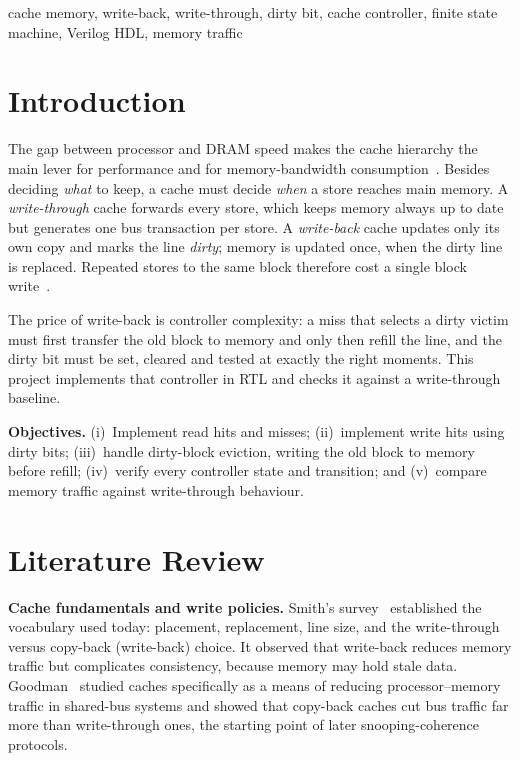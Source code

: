 \documentclass[conference]{IEEEtran}
\begin{document}
\begin{IEEEkeywords}
cache memory, write-back, write-through, dirty bit, cache controller, finite state
machine, Verilog HDL, memory traffic
\end{IEEEkeywords}

\section{Introduction}
The gap between processor and DRAM speed makes the cache hierarchy the main lever
for performance and for memory-bandwidth consumption~\cite{hp_quant,jacob}.
Besides deciding \emph{what} to keep, a cache must decide \emph{when} a store
reaches main memory. A \emph{write-through} cache forwards every store,
which keeps memory always up to date but generates one bus transaction per store.
A \emph{write-back} cache updates only its own copy and marks the line
\emph{dirty}; memory is updated once, when the dirty line is replaced. Repeated
stores to the same block therefore cost a single block write~\cite{smith82,goodman83}.

The price of write-back is controller complexity: a miss that selects a dirty
victim must first transfer the old block to memory and only then refill the line,
and the dirty bit must be set, cleared and tested at exactly the right moments.
This project implements that controller in RTL and checks it against a
write-through baseline.

\textbf{Objectives.} (i)~Implement read hits and misses; (ii)~implement write hits
using dirty bits; (iii)~handle dirty-block eviction, writing the old block to memory
before refill; (iv)~verify every controller state and transition; and (v)~compare
memory traffic against write-through behaviour.

\section{Literature Review}
\textbf{Cache fundamentals and write policies.} Smith's survey~\cite{smith82}
established the vocabulary used today: placement, replacement, line size, and
the write-through versus copy-back (write-back) choice. It observed that
write-back reduces memory traffic but complicates consistency, because memory may
hold stale data. Goodman~\cite{goodman83} studied caches specifically as a means
of reducing processor--memory traffic in shared-bus systems and showed that
copy-back caches cut bus traffic far more than write-through ones, the starting
point of later snooping-coherence protocols.
\end{document}
